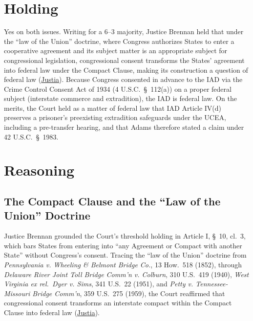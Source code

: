 \documentclass[12pt]{article}
\begin{document}
\section{Holding}

Yes on both issues. Writing for a 6--3 majority, Justice Brennan held that under the ``law of the Union'' doctrine, where Congress authorizes States to enter a cooperative agreement and its subject matter is an appropriate subject for congressional legislation, congressional consent transforms the States' agreement into federal law under the Compact Clause, making its construction a question of federal law (\href{https://supreme.justia.com/cases/federal/us/449/433/}{Justia}). Because Congress consented in advance to the IAD via the Crime Control Consent Act of 1934 (4 U.S.C.\ \S\ 112(a)) on a proper federal subject (interstate commerce and extradition), the IAD is federal law. On the merits, the Court held as a matter of federal law that IAD Article IV(d) preserves a prisoner's preexisting extradition safeguards under the UCEA, including a pre-transfer hearing, and that Adams therefore stated a claim under 42 U.S.C.\ \S\ 1983.

\section{Reasoning}

\subsection{The Compact Clause and the ``Law of the Union'' Doctrine}
Justice Brennan grounded the Court's threshold holding in Article I, \S\ 10, cl.\ 3, which bars States from entering into ``any Agreement or Compact with another State'' without Congress's consent. Tracing the ``law of the Union'' doctrine from \textit{Pennsylvania v. Wheeling \& Belmont Bridge Co.}, 13 How.\ 518 (1852), through \textit{Delaware River Joint Toll Bridge Comm'n v. Colburn}, 310 U.S.\ 419 (1940), \textit{West Virginia ex rel.\ Dyer v. Sims}, 341 U.S.\ 22 (1951), and \textit{Petty v. Tennessee-Missouri Bridge Comm'n}, 359 U.S.\ 275 (1959), the Court reaffirmed that congressional consent transforms an interstate compact within the Compact Clause into federal law (\href{https://supreme.justia.com/cases/federal/us/449/433/}{Justia}).
\end{document}
